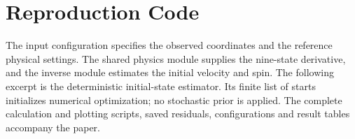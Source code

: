 \documentclass[12pt,letterpaper]{article}
\begin{document}
\newpage
{}
\section*{Reproduction Code}
The input configuration specifies the observed coordinates and the reference physical settings. The shared physics module supplies the nine-state derivative, and the inverse module estimates the initial velocity and spin. The following excerpt is the deterministic initial-state estimator. Its finite list of starts initializes numerical optimization; no stochastic prior is applied. The complete calculation and plotting scripts, saved residuals, configurations and result tables accompany the paper.

\end{document}
